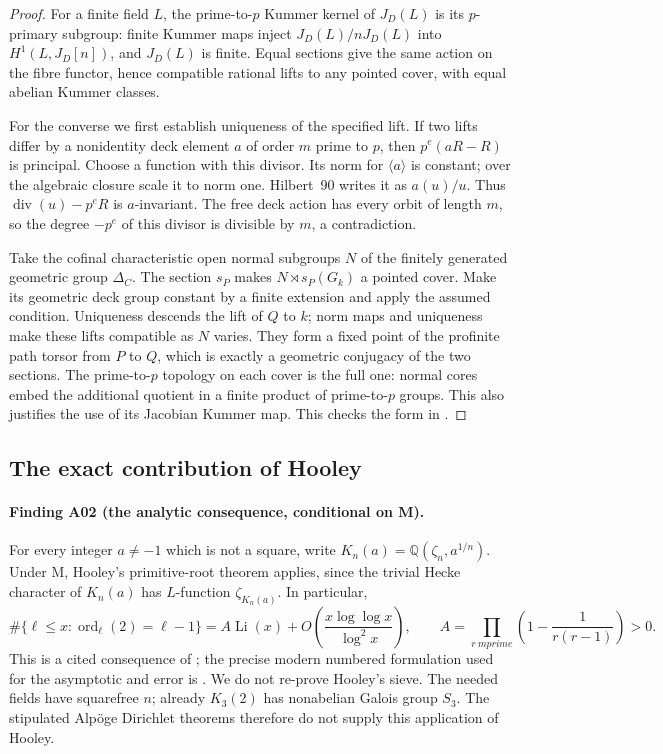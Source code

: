 \documentclass[11pt,a4paper]{article}
\begin{document}
\begin{proof}
For a finite field $L$, the prime-to-$p$ Kummer kernel of $J_D(L)$ is its
$p$-primary subgroup: finite Kummer maps inject $J_D(L)/nJ_D(L)$ into
$H^1(L,J_D[n])$, and $J_D(L)$ is finite. Equal sections give the same
action on the fibre functor, hence compatible rational lifts to any
pointed cover, with equal abelian Kummer classes.

For the converse we first establish uniqueness of the specified lift.
If two lifts differ by a nonidentity deck element $a$ of order $m$ prime
to $p$, then $p^e(aR-R)$ is principal. Choose a function with this
divisor. Its norm for $\langle a\rangle$ is constant; over the algebraic
closure scale it to norm one. Hilbert~90 writes it as $a(u)/u$.
Thus $\operatorname{div}(u)-p^eR$ is $a$-invariant. The free deck action
has every orbit of length $m$, so the degree $-p^e$ of this divisor is
divisible by $m$, a contradiction.

Take the cofinal characteristic open normal subgroups $N$ of the finitely
generated geometric group $\Delta_C$. The section $s_P$ makes
$N\rtimes s_P(G_k)$ a pointed cover. Make its geometric deck group
constant by a finite extension and apply the assumed condition.
Uniqueness descends the lift of $Q$ to $k$; norm maps and uniqueness
make these lifts compatible as $N$ varies. They form a fixed point of
the profinite path torsor from $P$ to $Q$, which is exactly a geometric
conjugacy of the two sections. The prime-to-$p$ topology on each cover
is the full one: normal cores embed the additional quotient in a finite
product of prime-to-$p$ groups. This also justifies the use of its
Jacobian Kummer map. This checks the form in \cite[A.31]{A1run}.
\end{proof}

\subsection{The exact contribution of Hooley}

\paragraph{Finding A02 (the analytic consequence, conditional on M).}
For every integer $a\ne-1$ which is not a square, write
$K_n(a)=\mathbb Q(\zeta_n,a^{1/n})$. Under M, Hooley's primitive-root
theorem applies, since the trivial Hecke character of $K_n(a)$ has
$L$-function $\zeta_{K_n(a)}$. In particular,
\[
 \#\{\ell\le x:\operatorname{ord}_{\ell}(2)=\ell-1\}
 = A\operatorname{Li}(x)
   +O\!\left(\frac{x\log\log x}{\log^2x}\right),\qquad
 A=\prod_{r\ {
m prime}}\left(1-\frac1{r(r-1)}\right)>0.
 \tag{A02}
\]
This is a cited consequence of \cite[\S7, concluding theorem]{Hooley}; the precise modern
numbered formulation used for the asymptotic and error is
\cite[Theorem~1.1, specialized to $a=2$]{FanPollack}. We do not re-prove
Hooley's sieve. The needed fields have squarefree $n$; already $K_3(2)$
has nonabelian Galois group $S_3$. The stipulated Alp\"oge Dirichlet
theorems therefore do not supply this application of Hooley.
\end{document}
